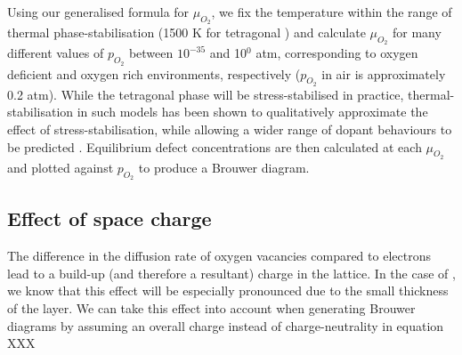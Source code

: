 Using our generalised formula for $\mu_{O_2}$, we fix the temperature within the range of thermal phase-stabilisation (1500 K for tetragonal \zirconia) and calculate $\mu_{O_2}$ for many different values of $p_{O_2}$ between $10^{-35}$ and 10$^{0}$ atm, corresponding to oxygen deficient and oxygen rich environments, respectively ($p_{O_2}$ in air is approximately 0.2 atm). While the tetragonal phase will be stress-stabilised in practice, thermal-stabilisation in such models has been shown to qualitatively approximate the effect of stress-stabilisation, while allowing a wider range of dopant behaviours to be predicted \cite{Bell2016}. Equilibrium defect concentrations are then calculated at each $\mu_{O_2}$ and plotted against $p_{O_2}$ to produce a Brouwer diagram. 

\subsection{Effect of space charge}

The difference in the diffusion rate of oxygen vacancies compared to electrons lead to a build-up (and therefore a resultant) charge in the lattice. In the case of \zirconia , we know that this effect will be especially pronounced due to the small thickness of the layer. We can take this effect into account when generating Brouwer diagrams by assuming an overall charge instead of charge-neutrality in equation XXX

